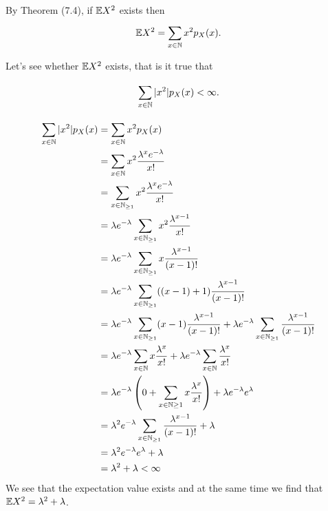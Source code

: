 
By Theorem (7.4), if $ \mathbb{E} X^2$ exists then 
\[
    \mathbb{E} X^2 = \sum_{x\in \mathbb{N}}^{} x^2 p_{X} (x)
.\] 

Let's see whether $ \mathbb{E} X^2$ exists, that is it true that 

\[
    \sum_{x \in \mathbb{N}}^{} |x^2| p_{X} (x) < \infty
.\] 

\begin{align*}
    \sum_{x \in \mathbb{N}}^{} |x^2| p_{X} (x) &= \sum_{x\in \mathbb{N}}^{} x^2 p_{X} (x)\\
				      &= \sum_{x \in \mathbb{N}}^{} x^2 \frac{\lambda^{x} e^{-\lambda} }{x!}
				      \\
				      &= \sum_{x \in \mathbb{N}_{\geq 1} }^{} x^2 \frac{\lambda^{x}
				      e^{-\lambda} }{x!} \\
				      &= \lambda e^{-\lambda} \sum_{x \in \mathbb{N}_{\geq 1}}^{} x^2
				      \frac{\lambda^{x-1} }{x!} \\
				      &= \lambda e^{-\lambda} \sum_{x \in \mathbb{N}_{\geq 1}}^{} x
				      \frac{\lambda^{x-1} }{(x-1)!} \\
				      &= \lambda e^{-\lambda} \sum_{x \in \mathbb{N}_{\geq 1} }^{} ((x-1) +
				      1) \frac{\lambda^{x-1} }{(x-1)!} \\
				      &= \lambda e^{-\lambda} \sum_{x\in \mathbb{N}_{\geq 1} }^{} (x-1)
				      \frac{\lambda^{x-1} }{(x-1)!} + \lambda e^{-\lambda} \sum_{x
				      \in \mathbb{N}_{\geq 1} }^{} \frac{\lambda^{x-1}}{(x-1)!} \\
				      &= \lambda e^{-\lambda} \sum_{x\in \mathbb{N}}^{} x \frac{\lambda^{x}
				      }{x!} + \lambda e^{-\lambda} \sum_{x\in \mathbb{N}}^{}
				      \frac{\lambda^{x} }{x!} \\
				      &= \lambda e^{-\lambda} \left( 0 + \sum_{x\in \mathbb{N} \geq 1}^{}
				      x \frac{\lambda^{x} }{x!} \right) + \lambda e^{-\lambda}
				      e^{\lambda} \\
				      &= \lambda^2 e^{-\lambda} \sum_{x \in \mathbb{N}_{\geq 1}}^{}
				      \frac{\lambda^{x-1} }{(x-1)!} + \lambda\\
				      &= \lambda^2 e^{-\lambda} e^{\lambda} + \lambda\\
				      &= \lambda^2+ \lambda < \infty
\end{align*}
We see that the expectation value exists and at the same time we find that $ \mathbb{E} X^2 = \lambda^2 +
\lambda$.
